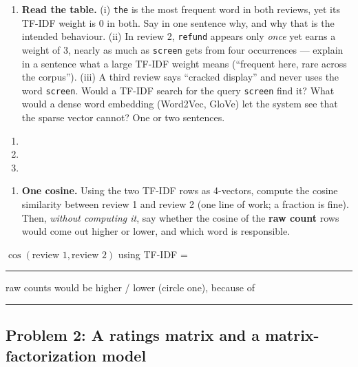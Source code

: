\documentclass[
  11pt,
]{article}
\providecommand{\tightlist}{%
  \setlength{\itemsep}{0pt}\setlength{\parskip}{0pt}}
\newcommand{\answerspace}[1]{\par\vspace*{#1}}  %
\newcommand{\blank}[1][1.2in]{\rule{#1}{0.4pt}}
\newcommand{\answerpage}{\clearpage}
\begin{document}
\begin{enumerate}
\def\labelenumi{(\alph{enumi})}
\tightlist
\item
  \textbf{Read the table.} (i) \texttt{the} is the most frequent word in
  both reviews, yet its TF-IDF weight is 0 in both. Say in one sentence
  why, and why that is the intended behaviour. (ii) In review 2,
  \texttt{refund} appears only \emph{once} yet earns a weight of 3,
  nearly as much as \texttt{screen} gets from four occurrences ---
  explain in a sentence what a large TF-IDF weight means (``frequent
  here, rare across the corpus''). (iii) A third review says ``cracked
  display'' and never uses the word \texttt{screen}. Would a TF-IDF
  search for the query \texttt{screen} find it? What would a dense word
  embedding (Word2Vec, GloVe) let the system see that the sparse vector
  cannot? One or two sentences.
\end{enumerate}

\begin{enumerate}
\def\labelenumi{(\roman{enumi})}
\item
  \answerspace{0.8in}
\item
  \answerspace{0.8in}
\item
  \answerspace{1.0in}
\end{enumerate}

\begin{enumerate}
\def\labelenumi{(\alph{enumi})}
\setcounter{enumi}{1}
\tightlist
\item
  \textbf{One cosine.} Using the two TF-IDF rows as 4-vectors, compute
  the cosine similarity between review 1 and review 2 (one line of work;
  a fraction is fine). Then, \emph{without computing it}, say whether
  the cosine of the \textbf{raw count} rows would come out higher or
  lower, and which word is responsible.
\end{enumerate}

\(\cos(\text{review 1}, \text{review 2})\) using TF-IDF =
\blank[0.9in]\qquad raw counts would be higher / lower (circle one),
because of \blank[1.0in]

\answerspace{1.6in}

\answerpage

\subsection{Problem 2: A ratings matrix and a matrix-factorization
model}\label{problem-2-a-ratings-matrix-and-a-matrix-factorization-model}
\end{document}
